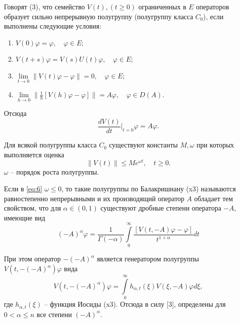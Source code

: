 \documentclass[14pt,a4paper]{article}
\theoremstyle{plain}
\numberwithin{equation}{section}
\begin{document}
Говорят (3), что семейство $V(t), (t \ge 0)$ ограниченных в $E$ операторов образует сильно непрерывную
полугруппу (полугруппу класса $C_0$), если выполнены следующие условия:
\begin{enumerate}
    \item $V(0)\varphi = \varphi, \quad \varphi \in E$;
    \item $V(t+s)\varphi = V(s)U(t)\varphi, \quad \varphi \in E$;
    \item $\lim\limits_{t\to0} \|V(t)\varphi-\varphi\| = 0, \quad \varphi \in E$;
    \item $\lim\limits_{h\to0} \|\frac{1}{h}[V(h)\varphi-\varphi]\| = A\varphi, \quad \varphi \in D(A)$.
\end{enumerate}
Отсюда
\begin{equation}
    \frac{dV(t)}{dt}\bigg|_{t=0} \varphi = A\varphi.
\end{equation}

Для всякой полугруппы класса $C_0$ существуют константы $M, \omega$ при которых выполняется оценка
\begin{equation}
    \label{eq:6}
    \|V(t)\| \le Me^{\omega t}, \quad t \ge 0.
\end{equation}
$\omega$ -- порядок роста полугруппы.


Если в \ref{eq:6} $\omega \le 0$, то такие полугруппы по Балакришнану (x3) называются равностепенно
непрерывными и их производящий оператор $A$ обладает тем свойством, что для $\alpha \in (0, 1)$ существуют
дробные степени оператора $-A$, имеющие вид
\begin{equation}
    (-A)^\alpha \varphi = \frac{1}{\Gamma(-\alpha)}
\int\limits_0^\infty \frac{[V(t, -A)\varphi-\varphi]}{t^{1+\alpha}} dt
\end{equation}

При этом оператор $-(-A)^\alpha$ является генератором полугруппы $V(t, -(-A)^\alpha)\varphi$ вида
\begin{equation}
    V(t, -(-A)^\alpha)\varphi = \int\limits_0^\infty h_{\alpha,t}(\xi) V(\xi, -A) \varphi d\xi,
\end{equation}
где $h_{\alpha,t}(\xi)$ -- функция Иосиды (x3). Отсюда в силу [3], определены для $0 < \alpha \le n$
все степени $(-A)^\alpha$.
\end{document}
